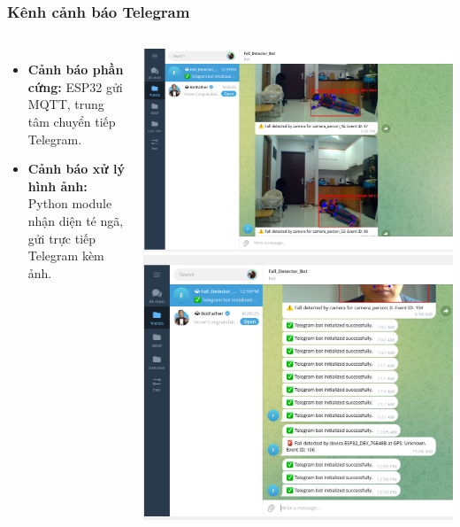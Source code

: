 \begin{frame}[t]
\frametitle{Kênh cảnh báo Telegram}
\begin{columns}[T]
    \begin{itemize}
        \item \textbf{Cảnh báo phần cứng:} ESP32 gửi MQTT, trung tâm chuyển tiếp Telegram.
        \item \textbf{Cảnh báo xử lý hình ảnh:} Python module nhận diện té ngã, gửi trực tiếp Telegram kèm ảnh.
    \end{itemize}

    \centering
    \includegraphics[width=0.9\linewidth]{images/telegram_python_fall_send.png}
    \vspace{0.2cm}
    \includegraphics[width=0.9\linewidth]{images/telegram_fall_module1_send.png}
\end{columns}
\end{frame}
